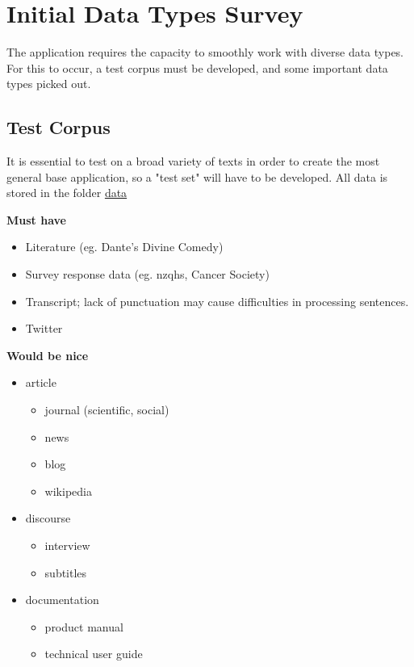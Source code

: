 \documentclass[a4paper, 11pt]{article}
\begin{document}
\section{Initial Data Types Survey}
\label{sec:org154457b}
The application requires the capacity to smoothly work with diverse
data types. For this to occur, a test corpus must be developed, and
some important data types picked out.
\subsection{Test Corpus}
\label{sec:orgcba07ea}
It is essential to test on a broad variety of texts in order to create
the most general base application, so a "test set" will have to be
developed. All data is stored in the folder \href{c:/Users/User/Desktop/stats-781/data}{data}

\textbf{Must have}

\begin{itemize}
\item Literature (eg. Dante's Divine Comedy)
\item Survey response data (eg. nzqhs, Cancer Society)
\item Transcript; lack of punctuation may cause difficulties in processing
sentences.
\item Twitter
\end{itemize}

\textbf{Would be nice}

\begin{itemize}
\item article
\begin{itemize}
\item journal (scientific, social)
\item news
\item blog
\item wikipedia
\end{itemize}
\item discourse
\begin{itemize}
\item interview
\item subtitles
\end{itemize}
\item documentation
\begin{itemize}
\item product manual
\item technical user guide
\end{itemize}
\end{itemize}
\end{document}
